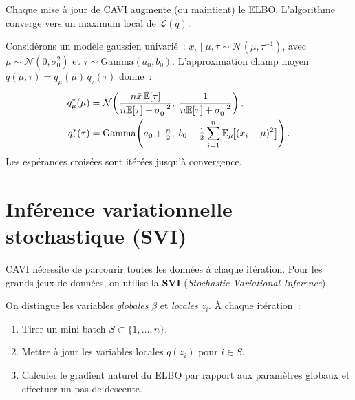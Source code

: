 \begin{proposition}
Chaque mise \`a jour de CAVI augmente (ou maintient) le ELBO. L'algorithme
converge vers un maximum local de $\mathcal{L}(q)$.
\end{proposition}

\begin{exemple}
Consid\'erons un mod\`ele gaussien univari\'e~: $x_i \mid \mu, \tau \sim \mathcal{N}(\mu, \tau^{-1})$,
avec $\mu \sim \mathcal{N}(0, \sigma_0^2)$ et $\tau \sim \mathrm{Gamma}(a_0, b_0)$.
L'approximation champ moyen $q(\mu, \tau) = q_\mu(\mu)\,q_\tau(\tau)$ donne~:
\begin{align}
  q_\mu^*(\mu) &= \mathcal{N}\!\left(\frac{n\bar{x}\,\mathbb{E}[\tau]}{n\mathbb{E}[\tau] + \sigma_0^{-2}},\;
                   \frac{1}{n\mathbb{E}[\tau] + \sigma_0^{-2}}\right), \\
  q_\tau^*(\tau) &= \mathrm{Gamma}\!\left(a_0 + \tfrac{n}{2},\;
                   b_0 + \tfrac{1}{2}\sum_{i=1}^n \mathbb{E}_\mu\!\bigl[(x_i - \mu)^2\bigr]\right).
\end{align}
Les esp\'erances crois\'ees sont it\'er\'ees jusqu'\`a convergence.
\end{exemple}

\section{Inf\'erence variationnelle stochastique (SVI)}

CAVI n\'ecessite de parcourir toutes les donn\'ees \`a chaque it\'eration.
Pour les grands jeux de donn\'ees, on utilise la \textbf{SVI}
(\emph{Stochastic Variational Inference}).

\begin{definition}[SVI]
On distingue les variables \emph{globales} $\beta$ et \emph{locales} $z_i$.
\`A chaque it\'eration~:
\begin{enumerate}
  \item Tirer un mini-batch $S \subset \{1, \ldots, n\}$.
  \item Mettre \`a jour les variables locales $q(z_i)$ pour $i \in S$.
  \item Calculer le gradient naturel du ELBO par rapport aux param\`etres
        globaux et effectuer un pas de descente.
\end{enumerate}
\end{definition}

